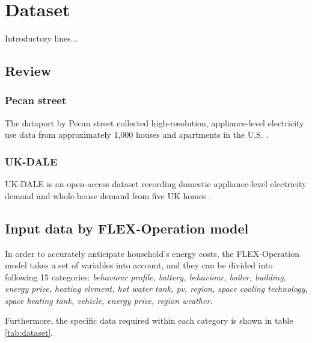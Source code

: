 \chapter{Dataset} 

Introductory lines...

\section{Review}

\subsection{Pecan street}

The dataport by Pecan street collected high-resolution, appliance-level electricity use data from approximately 1,000 houses and apartments in the U.S. \cite{pecanstreet}. 

\subsection{UK-DALE}

UK-DALE is an open-access dataset recording domestic appliance-level electricity demand and whole-house demand from five UK homes \cite{ukdale}.

\section{Input data by FLEX-Operation model}

In order to accurately anticipate household's energy costs,
the FLEX-Operation model takes a set of variables into account,
and they can be divided into following 15 categories: 
\emph{
    behaviour profile,
    battery,
    behaviour, 
    boiler,
    building,
    energy price,
    heating element, 
    hot water tank,
    \gls{pv},
    region,
    space cooling technology,
    space heating tank,
    vehicle,
    energy price,
    region weather. 
}

Furthermore, the specific data required within each category is shown in table \ref{tab:dataset}. 

